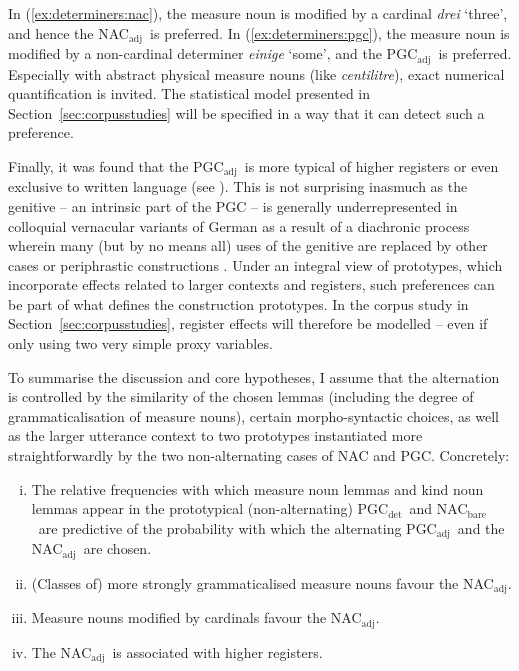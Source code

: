\documentclass[USenglish]{article}
\newcommand{\Sub}[1]{\ensuremath{\mathrm{_{#1}}}}
\newcommand{\NACb}{NAC\Sub{bare}}
\newcommand{\NACa}{NAC\Sub{adj}}
\newcommand{\PGCd}{PGC\Sub{det}}
\newcommand{\PGCa}{PGC\Sub{adj}}
\begin{document}
In (\ref{ex:determiners:nac}), the measure noun is modified by a cardinal \textit{drei} `three', and hence the \NACa\ is preferred.
In (\ref{ex:determiners:pgc}), the measure noun is modified by a non-cardinal determiner \textit{einige} `some', and the \PGCa\ is preferred.
Especially with abstract physical measure nouns (like \textit{centilitre}), exact numerical quantification is invited.
The statistical model presented in Section~\ref{sec:corpusstudies} will be specified in a way that it can detect such a preference.

Finally, it was found that the \PGCa\ is more typical of higher registers or even exclusive to written language (see \citealp[320--323]{Hentschel1993}).
This is not surprising inasmuch as the genitive -- an intrinsic part of the PGC -- is generally underrepresented in colloquial vernacular variants of German as a result of a diachronic process wherein many (but by no means all) uses of the genitive are replaced by other cases or periphrastic constructions \citep{FleischerSchallert2011}.
Under an integral view of prototypes, which incorporate effects related to larger contexts and registers, such preferences can be part of what defines the construction prototypes.
In the corpus study in Section~\ref{sec:corpusstudies}, register effects will therefore be modelled -- even if only using two very simple proxy variables.

To summarise the discussion and core hypotheses, I assume that the alternation is controlled by the similarity of the chosen lemmas (including the degree of grammaticalisation of measure nouns), certain morpho-syntactic choices, as well as the larger utterance context to two prototypes instantiated more straightforwardly by the two non-alternating cases of NAC and PGC.
Concretely:

\begin{enumerate}[i.]
  \item The relative frequencies with which measure noun lemmas and kind noun lemmas appear in the prototypical (non-alternating) \PGCd\ and \NACb\ are predictive of the probability with which the alternating \PGCa\ and the \NACa\ are chosen.
  \item (Classes of) more strongly grammaticalised measure nouns favour the \NACa.
  \item Measure nouns modified by cardinals favour the \NACa.
  \item The \NACa\ is associated with higher registers.
\end{enumerate}
\end{document}
